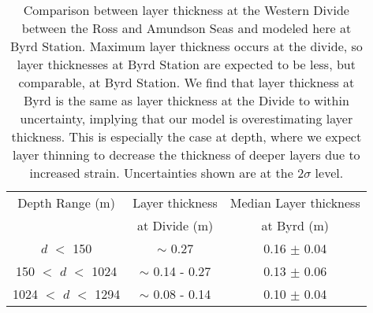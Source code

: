 \documentclass[12pt]{article}
\begin{document}
\begin{table}\label{accums}
\centering
\begin{tabular}{|c|c|c|}
\hline
Depth Range (m) & \multicolumn{1}{c|}{Layer thickness} & \multicolumn{1}{c|}{Median Layer thickness}  \\
& at Divide (m) & at Byrd  (m)\\
\hline
$\textit{d}$ $<$ 150 & $\sim$ 0.27 &  0.16 $\pm$ 0.04\\
150 $<$ $\textit{d}$ $<$ 1024 & $\sim$ 0.14 - 0.27 & 0.13  $\pm$ 0.06\\
1024 $<$ $\textit{d}$ $<$ 1294 & $\sim$ 0.08 - 0.14 & 0.10 $\pm$ 0.04\\
\hline
\end{tabular}
\captionsetup{width=.9\textwidth}
\caption{Comparison between layer thickness at the Western Divide between the Ross and Amundson Seas \citep{neumann2008} and modeled here at Byrd Station. Maximum layer thickness occurs at the divide, so layer thicknesses at Byrd Station are expected to be less, but comparable, at Byrd Station. We find that layer thickness at Byrd is the same as layer thickness at the Divide to within uncertainty, implying that our model is overestimating layer thickness. This is especially the case at depth, where we expect layer thinning to decrease the thickness of deeper layers due to increased strain. Uncertainties shown are at the 2$\sigma$ level.}
\end{table}

\end{document}

